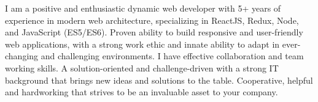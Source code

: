 

\begin{cvparagraph}

I am a positive and enthusiastic dynamic web developer with 5+ years of experience in modern web architecture, specializing in ReactJS, Redux, Node, and JavaScript (ES5/ES6). Proven ability to build responsive and user-friendly web applications, with a strong work ethic and innate ability to adapt in ever-changing and challenging environments. I have effective collaboration and team working skills. A solution-oriented and challenge-driven with a strong IT background that brings new ideas and solutions to the table. Cooperative, helpful and hardworking that strives to be an invaluable asset to your company.
\end{cvparagraph}
